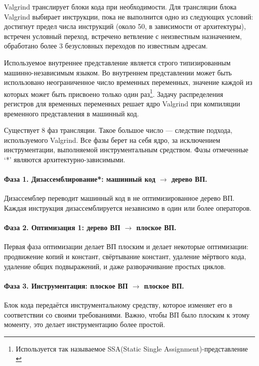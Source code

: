 \documentclass[a4paper,12pt,russian]{article}
\newcommand{\code}[1]{\textsf{#1}}
\begin{document}
\code{Valgrind} транслирует блоки кода при необходимости. Для трансляции блока \code{Valgrind} выбирает инструкции, пока не выполнится одно из следующих условий: достигнут предел числа инструкций (около 50, в зависимости от архитектуры), встречен условный переход, встречено ветвление с неизвестным назначением, обработано более 3 безусловных переходов по известным адресам.

Используемое внутреннее представление является строго типизированным машинно-независимым языком. Во внутреннем представлении может быть использовано неограниченное число временных переменных, значение каждой из которых может быть присвоено только один раз\footnote{Используется так называемое SSA(Static Single Assignment)-представление \cite{aho_compilers}}. Задачу распределения регистров для временных переменных решает ядро \code{Valgrind} при компиляции временного представления в машинный код.

Существует 8 фаз трансляции. Такое большое число --- следствие подхода, используемого \code{Valgrind}. Все фазы берет на себя ядро, за исключением инструментации, выполняемой инструментальным средством. Фазы отмеченные `*' являются архитектурно-зависимыми.

\paragraph{Фаза 1. Дизассемблирование*: машинный код $\longrightarrow$ дерево ВП.}
Дизассемблер переводит машинный код в не оптимизированное дерево ВП. Каждая инструкция дизассемблируется независимо в один или более операторов.

\paragraph{Фаза 2. Оптимизация 1: дерево ВП $\longrightarrow$ плоское ВП.}
Первая фаза оптимизации делает ВП плоским и делает некоторые оптимизации: продвижение копий и констант, свёртывание констант, удаление мёртвого кода, удаление общих подвыражений, и даже разворачивание простых циклов.

\paragraph{Фаза 3. Инструментация: плоское ВП $\longrightarrow$ плоское ВП.}
Блок кода передаётся инструментальному средству, которое изменяет его в соответствии со своими требованиями. Важно, чтобы ВП было плоским к этому моменту, это делает инструментацию более простой.
\end{document}
